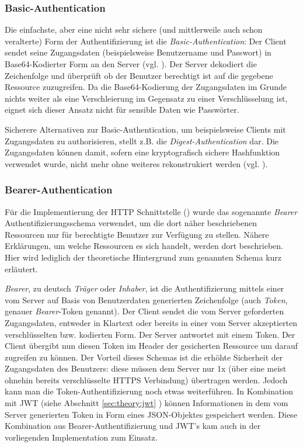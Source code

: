 \subsubsection{Basic-Authentication}
Die einfachste, aber eine nicht sehr sichere (und mittlerweile auch schon veralterte) Form der Authentifizierung ist die \textit{Basic-Authentication}: Der Client sendet seine Zugangsdaten (beispielsweise Benutzername und Passwort) in Base64-Kodierter Form an den Server (vgl. \cite{wiki:base64}). Der Server dekodiert die Zeichenfolge und überprüft ob der Benutzer berechtigt ist auf die gegebene Ressource zuzugreifen. Da die Base64-Kodierung der Zugangsdaten im Grunde nichts weiter als eine Verschleierung im Gegensatz zu einer Verschlüsselung ist, eignet sich dieser Ansatz nicht für sensible Daten wie Passwörter.\bigskip  

\noindent
Sicherere Alternativen zur Basic-Authentication, um beispielsweise Clients mit Zugangsdaten zu authorisieren, stellt z.B. die \textit{Digest-Authentication} dar. Die Zugangsdaten können damit, sofern eine kryptografisch sichere Hashfunktion verwendet wurde, nicht mehr ohne weiteres rekonstrukiert werden (vgl. \cite{wiki:http:auth:digest}).

\subsubsection{Bearer-Authentication}
Für die Implementierung der HTTP Schnittstelle () wurde das sogenannte \textit{Bearer} Authentifizierungsschema verwendet, um die dort näher beschriebenen Ressourcen nur für berechtigte Benutzer zur Verfügung zu stellen. Nähere Erklärungen, um welche Ressourcen es sich handelt, werden dort beschrieben. Hier wird lediglich der theoretische Hintergrund zum genannten Schema kurz erläutert.\bigskip

\noindent
\textit{Bearer}, zu deutsch \textit{Träger} oder \textit{Inhaber}, ist die Authentifizierung mittels einer vom Server auf Basis von Benutzerdaten generierten Zeichenfolge (auch \textit{Token}, genauer \textit{Bearer}-Token genannt). Der Client sendet die vom Server geforderten Zugangsdaten, entweder in Klartext oder bereits in einer vom Server akzeptierten verschlüsselten bzw. kodierten Form. Der Server antwortet mit einem Token. Der Client übergibt nun diesen Token im  Header der gesicherten Ressource um darauf zugreifen zu können. Der Vorteil dieses Schemas ist die erhöhte Sicherheit der Zugangsdaten des Benutzers: diese müssen dem Server nur 1x (über eine meist ohnehin bereits verschlüsselte HTTPS Verbindung) übertragen werden. Jedoch kann man die Token-Authentifizierung noch etwas weiterführen. In Kombination mit JWT (siehe Abschnitt \ref{sec:theory:jwt} ) können Informationen in dem vom Server generierten Token in Form eines JSON-Objektes gespeichert werden. Diese Kombination aus Bearer-Authentifizierung und JWT's kam auch in der vorliegenden Implementation zum Einsatz. 

